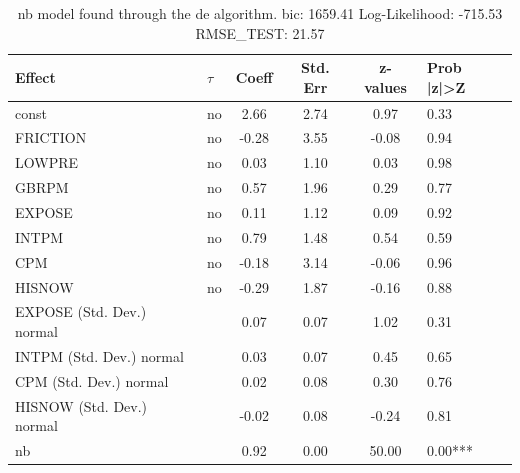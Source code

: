 \begin{table}
	\caption{nb model found through the de algorithm. bic: 1659.41 Log-Likelihood: -715.53 RMSE_TEST: 21.57}
	\begin{center}
		\begin{tabular}{|l|l|c|c|c|l|}
			\hline
			Effect & $\tau$ & Coeff & Std. Err & z-values & Prob |z|>Z \\
			\hline
			const & no & 2.66 & 2.74 & 0.97 & 0.33 \\
			\hline
			FRICTION & no & -0.28 & 3.55 & -0.08 & 0.94 \\
			\hline
			LOWPRE & no & 0.03 & 1.10 & 0.03 & 0.98 \\
			\hline
			GBRPM & no & 0.57 & 1.96 & 0.29 & 0.77 \\
			\hline
			EXPOSE & no & 0.11 & 1.12 & 0.09 & 0.92 \\
			\hline
			INTPM & no & 0.79 & 1.48 & 0.54 & 0.59 \\
			\hline
			CPM & no & -0.18 & 3.14 & -0.06 & 0.96 \\
			\hline
			HISNOW & no & -0.29 & 1.87 & -0.16 & 0.88 \\
			\hline
			EXPOSE (Std. Dev.) normal &  & 0.07 & 0.07 & 1.02 & 0.31 \\
			\hline
			INTPM (Std. Dev.) normal &  & 0.03 & 0.07 & 0.45 & 0.65 \\
			\hline
			CPM (Std. Dev.) normal &  & 0.02 & 0.08 & 0.30 & 0.76 \\
			\hline
			HISNOW (Std. Dev.) normal &  & -0.02 & 0.08 & -0.24 & 0.81 \\
			\hline
			nb &  & 0.92 & 0.00 & 50.00 & 0.00*** \\
			\hline
		\end{tabular}
	\end{center}
\end{table}